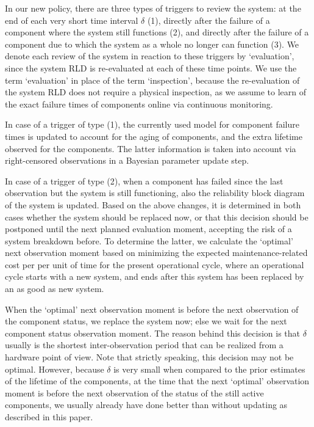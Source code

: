 \documentclass[authoryear]{elsarticle}
\begin{document}
In our new policy, there are three types of triggers to review the system:
at the end of each very short time interval $\delta$ (1),
directly after the failure of a component where the system still functions (2),
and directly after the failure of a component due to which the system as a whole no longer can function (3). 
We denote each review of the system in reaction to these triggers by `evaluation',
since the system RLD is re-evaluated at each of these time points.
We use the term `evaluation' in place of the term `inspection',
because the re-evaluation of the system RLD does not require a physical inspection,
as we assume to learn of the exact failure times of components online via continuous monitoring.

In case of a trigger of type (1),
the currently used model for component failure times is updated
to account for the aging of components,
and the extra lifetime observed for the components.
The latter information is taken into account via right-censored observations
in a Bayesian parameter update step.

In case of a trigger of type (2),
when a component has failed since the last observation but the system is still functioning,
also the reliability block diagram of the system is updated.
Based on the above changes,
it is determined in both cases whether the system should be replaced now,
or that this decision should be postponed until the next planned evaluation moment,
accepting the risk of a system breakdown before.
To determine the latter,
we calculate the `optimal' next observation moment
based on minimizing the expected maintenance-related cost per per unit of time for the present operational cycle,
where an operational cycle starts with a new system, and ends after this system has been replaced by an as good as new system. 

When the `optimal' next observation moment is before the next observation of the component status, we replace the system now;
else we wait for the next component status observation moment.
The reason behind this decision is that $\delta$ usually is the shortest inter-observation period
that can be realized from a hardware point of view.
Note that strictly speaking, this decision may not be optimal.
However, because $\delta$ is very small when compared to the prior estimates of the lifetime of the components,
at the time that the next `optimal' observation moment is before the next observation of the status of the still active components,
we usually already have done better than without updating as described in this paper.
\end{document}
